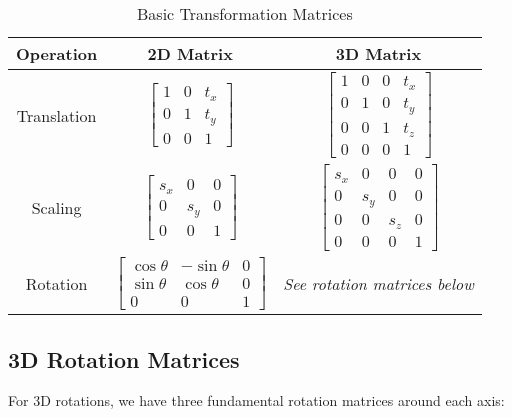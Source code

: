 \documentclass[12pt]{article}
\begin{document}
\begin{table}[h]
\centering
\begin{tabular}{ccc}
\toprule
\textbf{Operation} & \textbf{2D Matrix} & \textbf{3D Matrix} \\
\midrule
Translation & 
$\begin{bmatrix} 
1 & 0 & t_x \\
0 & 1 & t_y \\
0 & 0 & 1
\end{bmatrix}$ & 
$\begin{bmatrix}
1 & 0 & 0 & t_x \\
0 & 1 & 0 & t_y \\
0 & 0 & 1 & t_z \\
0 & 0 & 0 & 1
\end{bmatrix}$ \\
\midrule
Scaling & 
$\begin{bmatrix}
s_x & 0 & 0 \\
0 & s_y & 0 \\
0 & 0 & 1
\end{bmatrix}$ &
$\begin{bmatrix}
s_x & 0 & 0 & 0 \\
0 & s_y & 0 & 0 \\
0 & 0 & s_z & 0 \\
0 & 0 & 0 & 1
\end{bmatrix}$ \\
\midrule
Rotation & 
$\begin{bmatrix}
\cos\theta & -\sin\theta & 0 \\
\sin\theta & \cos\theta & 0 \\
0 & 0 & 1
\end{bmatrix}$ &
\textit{See rotation matrices below} \\
\bottomrule
\end{tabular}
\caption{Basic Transformation Matrices}
\label{tab:transformation-matrices}
\end{table}

\subsection{3D Rotation Matrices}
For 3D rotations, we have three fundamental rotation matrices around each axis:
\end{document}

